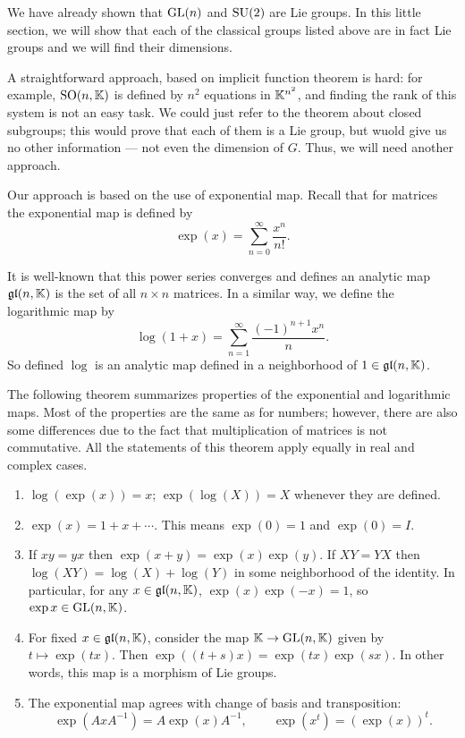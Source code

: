 We have already shown that $\mathrm{GL}(n)$ and $\mathrm{SU}(2)$ are Lie groups. In this
little section, we will show that each of the classical groups listed above
are in fact Lie groups and we will find their dimensions.

A straightforward approach, based on implicit function theorem is hard: for
example, $\mathrm{SO}(n,\mathbb{K})$ is defined by $n^2$ equations in $\mathbb{K}^{n^2}$, and
finding the rank of this system is not an easy task. We could just refer to
the theorem about closed subgroups; this would prove that each of them is a
Lie group, but wuold give us no other information --- not even the
dimension of $G$. Thus, we will need another approach.

Our approach is based on the use of exponential map. Recall that for
matrices the exponential map is defined by
\[
  \exp(x)=\sum_{n=0}^\infty \frac{x^n}{n!}.
\]

It is well-known that this power series converges and defines an analytic
map $\mathfrak{gl}(n,\mathbb{K})$ is the set of all $n\times n$ matrices. In a similar
way, we define the logarithmic map by
\[
  \log(1+x)=\sum_{n=1}^\infty\frac{(-1)^{n+1}x^n}{n}.
\]
So defined $\log$ is an analytic map defined in a neighborhood of
$1\in\mathfrak{gl}(n,\mathbb{K})$.

The following theorem summarizes properties of the exponential and
logarithmic maps. Most of the properties are the same as for numbers;
however, there are also some differences due to the fact that
multiplication of matrices is not commutative. All the statements of this
theorem apply equally in real and complex cases.

\begin{theorem}
  \hfill
  \begin{enumerate}[label=\textnormal{(\arabic*)}]
  \item $\log(\exp(x))=x$; $\exp(\log(X))=X$ whenever they are defined.
  \item $\exp(x)=1+x+\cdots$. This means $\exp(0)=1$ and $\exp(0)=I$.
  \item If $xy=yx$ then $\exp(x+y)=\exp(x)\exp(y)$. If $XY=YX$ then
    $\log(XY)=\log(X)+\log(Y)$ in some neighborhood of the identity. In
    particular, for any $x\in\mathfrak{gl}(n,\mathbb{K})$, $\exp(x)\exp(-x)=1$, so
    $\exp x\in\mathrm{GL}(n,\mathbb{K})$.
  \item For fixed $x\in\mathfrak{gl}(n,\mathbb{K})$, consider the map
    $\mathbb{K}\to\mathrm{GL}(n,\mathbb{K})$ given by $t\mapsto\exp(tx)$. Then
    $\exp((t+s)x)=\exp(tx)\exp(sx)$. In other words, this map is a morphism
    of Lie groups.
  \item The exponential map agrees with change of basis and transposition:
    \[
      \exp(AxA^{-1})=A\exp(x)A^{-1},\qquad \exp(x^t)=(\exp(x))^t.
    \]
  \end{enumerate}
\end{theorem}

